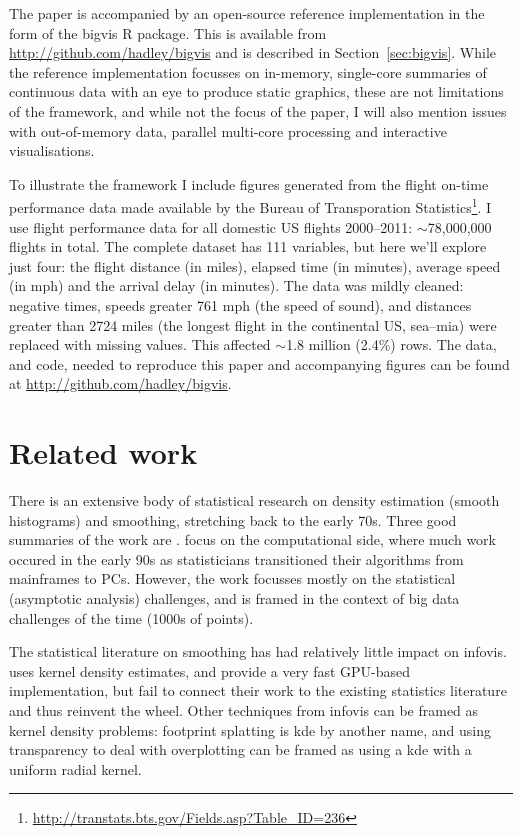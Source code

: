 \documentclass[journal]{vgtc}                %
\begin{document}
The paper is accompanied by an open-source reference implementation in the form of the bigvis R \citep{R} package. This is available from \url{http://github.com/hadley/bigvis} and is described in Section~\ref{sec:bigvis}. While the reference implementation focusses on in-memory, single-core summaries of continuous data with an eye to produce static graphics, these are not limitations of the framework, and while not the focus of the paper, I will also mention issues with out-of-memory data, parallel multi-core processing and interactive visualisations. 

To illustrate the framework I include figures generated from the flight on-time performance data made available by the Bureau of Transporation Statistics\footnote{\url{http://transtats.bts.gov/Fields.asp?Table_ID=236}}. I use flight performance data for all domestic US flights 2000--2011: $\sim$78,000,000 flights in total. The complete dataset has 111 variables, but here we'll explore just four: the flight distance (in miles), elapsed time (in minutes), average speed (in mph) and the arrival delay (in minutes). The data was mildly cleaned: negative times, speeds greater 761 mph (the speed of sound), and distances greater than 2724 miles (the longest flight in the continental US, {\sc sea}--{\sc mia}) were replaced with missing values. This affected $\sim$1.8 million (2.4\%) rows. The data, and code, needed to reproduce this paper and accompanying figures can be found at \url{http://github.com/hadley/bigvis}.

\section{Related work}
\label{sec:related-work}

There is an extensive body of statistical research on density estimation (smooth histograms) and smoothing, stretching back to the early 70s. Three good summaries of the work are \cite{scott:1992,bowman:1997,loader:1999a}.    \cite{hardle:1992,wand:1994,fan:1994} focus on the computational side, where much work occured in the early 90s as statisticians transitioned their algorithms from mainframes to PCs. However, the work focusses mostly on the statistical (asymptotic analysis) challenges, and is framed in the context of big data challenges of the time (1000s of points).

The statistical literature on smoothing has had relatively little impact on infovis. \citep{lampe:2011} uses kernel density estimates, and provide a very fast GPU-based implementation, but fail to connect their work to the existing statistics literature and thus reinvent the wheel. Other techniques from infovis can be framed as kernel density problems: footprint splatting \citep{becker:1997,yang:2003} is kde by another name, and using transparency to deal with overplotting \citep{johansson:2005,unwin:2006} can be framed as using a kde with a uniform radial kernel.
\end{document}
